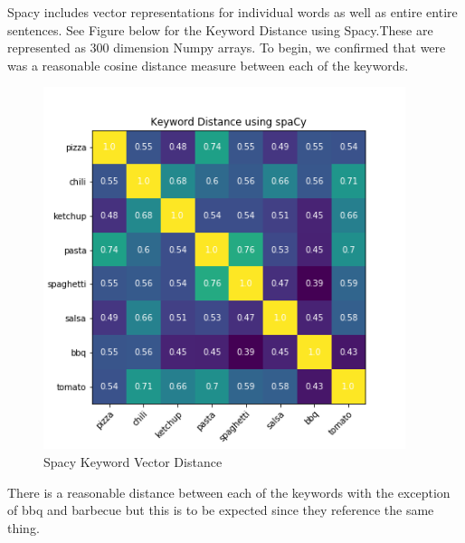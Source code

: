 \documentclass[12pt,oneside]{chicagocapstone}
\begin{document}
Spacy includes vector representations for individual words as well as
entire entire sentences. See Figure below for the Keyword Distance using
Spacy.These are represented as 300 dimension Numpy arrays. To begin, we
confirmed that were was a reasonable cosine distance measure between
each of the keywords.
\begin{figure}

{\centering \includegraphics[width=400px]{figure/Keyword_Distance_Spacy} 

}

\caption{Spacy Keyword Vector Distance}\label{fig:spacy-keyword}
\end{figure}
There is a reasonable distance between each of the keywords with the
exception of bbq and barbecue but this is to be expected since they
reference the same thing.
\end{document}
